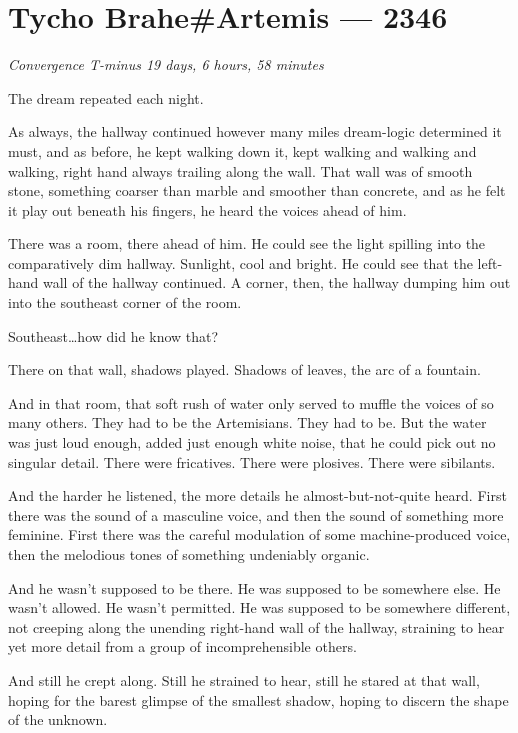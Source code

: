 \hypertarget{tycho-braheartemis-2346}{%
\chapter{Tycho Brahe\#Artemis — 2346}\label{tycho-braheartemis-2346}}

\begin{center}
\emph{Convergence T-minus 19 days, 6 hours, 58 minutes}
\end{center}

\noindent The dream repeated each night.

As always, the hallway continued however many miles dream-logic determined it must, and as before, he kept walking down it, kept walking and walking and walking, right hand always trailing along the wall. That wall was of smooth stone, something coarser than marble and smoother than concrete, and as he felt it play out beneath his fingers, he heard the voices ahead of him.

There was a room, there ahead of him. He could see the light spilling into the comparatively dim hallway. Sunlight, cool and bright. He could see that the left-hand wall of the hallway continued. A corner, then, the hallway dumping him out into the southeast corner of the room.

Southeast\ldots how did he know that?

There on that wall, shadows played. Shadows of leaves, the arc of a fountain.

And in that room, that soft rush of water only served to muffle the voices of so many others. They had to be the Artemisians. They had to be. But the water was just loud enough, added just enough white noise, that he could pick out no singular detail. There were fricatives. There were plosives. There were sibilants.

And the harder he listened, the more details he almost-but-not-quite heard. First there was the sound of a masculine voice, and then the sound of something more feminine. First there was the careful modulation of some machine-produced voice, then the melodious tones of something undeniably organic.

And he wasn't supposed to be there. He was supposed to be somewhere else. He wasn't allowed. He wasn't permitted. He was supposed to be somewhere different, not creeping along the unending right-hand wall of the hallway, straining to hear yet more detail from a group of incomprehensible others.

And still he crept along. Still he strained to hear, still he stared at that wall, hoping for the barest glimpse of the smallest shadow, hoping to discern the shape of the unknown.

